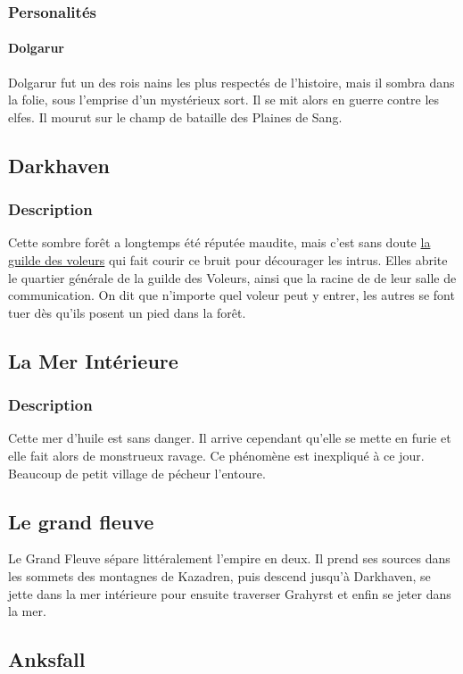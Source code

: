 \subsubsection{Personalités}
\paragraph{Dolgarur}
\hypertarget {dolgarur}{}Dolgarur fut un des rois nains les plus respectés de l'histoire, mais il sombra dans la folie, sous l'emprise d'un mystérieux sort. 
Il se mit alors en guerre contre les elfes. 
Il mourut sur le champ de bataille des Plaines de Sang.
\subsection{Darkhaven}
\subsubsection{Description}
\hypertarget{darkhaven}{}Cette sombre forêt a longtemps été réputée maudite,
mais c'est sans doute \hyperlink{laguildedesvoleurs}{la guilde des voleurs} qui fait courir ce bruit pour décourager les intrus.
Elles abrite le quartier générale de la guilde des Voleurs, ainsi que la racine de de leur salle de communication. 
On dit que n'importe quel voleur peut y entrer, les autres se font tuer dès qu'ils posent un pied dans la forêt.
\subsection{La Mer Intérieure}
\subsubsection{Description}
\hypertarget {lamerinterieure}{}Cette mer d'huile est sans danger.
Il arrive cependant qu’elle se mette en furie et elle fait alors de monstrueux ravage.
Ce phénomène est inexpliqué à ce jour.
Beaucoup de petit village de pécheur l'entoure.
\subsection{Le grand fleuve}
Le Grand Fleuve sépare littéralement l'empire en deux. Il prend ses sources dans les sommets des montagnes de Kazadren, puis descend jusqu'à Darkhaven, se jette dans la mer intérieure pour ensuite traverser Grahyrst et enfin se jeter dans la mer.
\subsection{Anksfall}
